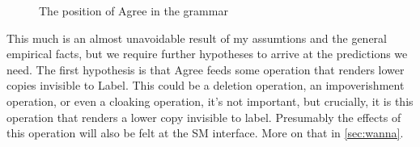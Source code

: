 \documentclass[MilwayThesis]{subfiles}
\begin{document}
%
\begin{figure}[h]
  \centering
  \caption{The position of Agree in the grammar}
  \label{fig:SepCycles}
\end{figure}

This much is an almost unavoidable result of my assumtions and the general empirical facts, but we require further hypotheses to arrive at the predictions we need.
The first hypothesis is that Agree feeds some operation that renders lower copies invisible to Label.
This could be a deletion operation, an impoverishment operation, or even a cloaking operation, it's not important, but crucially, it is this operation that renders a lower copy invisible to label.
Presumably the effects of this operation will also be felt at the SM interface.
More on that in \cref{sec:wanna}.
\end{document}
